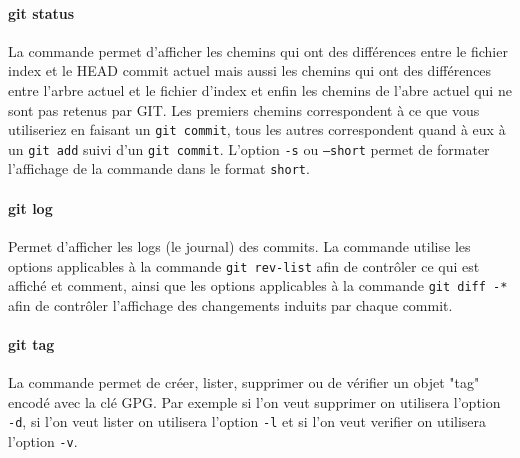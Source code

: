 \documentclass[11pt,canadien]{article}
\begin{document}
\paragraph{git status}La commande permet d'afficher les chemins qui ont des différences entre le fichier index et le HEAD commit actuel mais aussi les chemins qui ont des différences entre l'arbre actuel et le fichier d'index et enfin les chemins de l'abre actuel qui ne sont pas retenus par GIT. Les premiers chemins correspondent à ce que vous utiliseriez en faisant un \texttt{git commit}, tous les autres correspondent quand à eux à un \texttt{git add} suivi d'un \texttt{git commit}. L'option \texttt{-s} ou \texttt{--short} permet de formater l'affichage de la commande dans le format \texttt{short}.

\paragraph{git log}Permet d'afficher les logs (le journal) des commits. La commande utilise les options applicables à la commande \texttt{git rev-list} afin de contrôler ce qui est affiché et comment, ainsi que les options applicables à la commande \texttt{git diff -*} afin de contrôler l'affichage des changements induits par chaque commit.

\paragraph{git tag}La commande permet de créer, lister, supprimer ou de vérifier un objet "tag" encodé avec la clé GPG. Par exemple si l'on veut supprimer on utilisera  l'option \texttt{-d}, si l'on veut lister on utilisera l'option \texttt{-l} et si l'on veut verifier on utilisera l'option \texttt{-v}.
\end{document}
